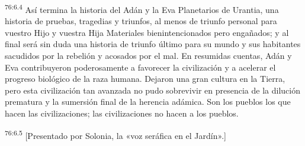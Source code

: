 \par
\textsuperscript{76:6.4} Así termina la historia del Adán y la Eva Planetarios de Urantia, una historia de pruebas, tragedias y triunfos, al menos de triunfo personal para vuestro Hijo y vuestra Hija Materiales bienintencionados pero engañados; y al final será sin duda una historia de triunfo último para su mundo y sus habitantes sacudidos por la rebelión y acosados por el mal. En resumidas cuentas, Adán y Eva contribuyeron poderosamente a favorecer la civilización y a acelerar el progreso biológico de la raza humana. Dejaron una gran cultura en la Tierra, pero esta civilización tan avanzada no pudo sobrevivir en presencia de la dilución prematura y la sumersión final de la herencia adámica. Son los pueblos los que hacen las civilizaciones; las civilizaciones no hacen a los pueblos.

\par
\textsuperscript{76:6.5} [Presentado por Solonia, la «voz seráfica en el Jardín».]